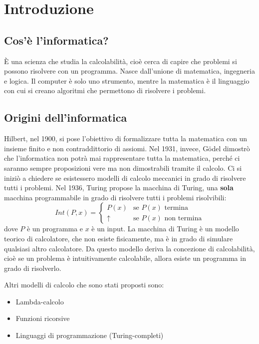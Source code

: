 \documentclass[a4paper]{article}
\begin{document}


\tableofcontents
\pagebreak

\section{Introduzione}
\subsection{Cos'è l'informatica?}
È una scienza che studia la calcolabilità, cioè cerca di capire che problemi si possono
risolvere con un programma. Nasce dall'unione di matematica, ingegneria e logica. Il
computer è solo uno strumento, mentre la matematica è il linguaggio con cui si
creano algoritmi che permettono di risolvere i problemi.

\subsection{Origini dell'informatica}
Hilbert, nel 1900, si pose l'obiettivo di formalizzare tutta la matematica con un insieme
finito e non contraddittorio di assiomi. Nel 1931, invece, Gödel dimostrò che l'informatica
non potrà mai rappresentare tutta la matematica, perché ci saranno sempre proposizioni
vere ma non dimostrabili tramite il calcolo. Ci si iniziò a chiedere se esistessero
modelli di calcolo meccanici in grado di risolvere tutti i problemi. Nel 1936, Turing
propose la macchina di Turing, una \textbf{sola} macchina programmabile in grado di
risolvere tutti i problemi risolvibili:
\[
  Int(P,x) = \begin{cases}
    P(x) & \text{se } P(x) \text{ termina}\\
    \uparrow & \text{se } P(x) \text{ non termina}
  \end{cases}
\] 
dove $P$ è un programma e $x$ è un input. La macchina di Turing è un modello teorico
di calcolatore, che non esiste fisicamente, ma è in grado di simulare qualsiasi altro
calcolatore. Da questo modello deriva la concezione di calcolabilità, cioè se un problema
è intuitivamente calcolabile, allora esiste un programma in grado di risolverlo.

Altri modelli di calcolo che sono stati proposti sono:
\begin{itemize}
  \item Lambda-calcolo
  \item Funzioni ricorsive
  \item Linguaggi di programmazione (Turing-completi)
\end{itemize}
\end{document}
